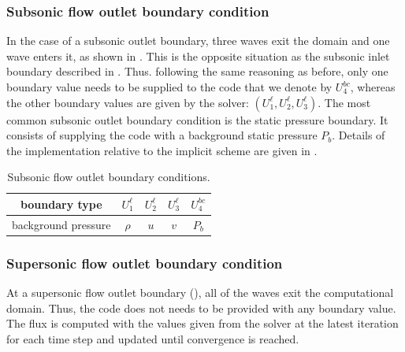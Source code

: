 \subsubsection{Subsonic flow outlet boundary condition} \label{sec:sub-flow-outlet-bc}
In the case of a subsonic outlet boundary, three waves exit the domain and one wave enters it, as shown in . This is the opposite situation as the subsonic inlet boundary described in . Thus. following the same reasoning as before, only one boundary value needs to be supplied to the code that we denote by $U_4^{bc}$, whereas the other boundary values are given by the solver: $\left(U_1^{\ell}, U_2^{\ell}, U_3^{\ell}\right)$. The most common subsonic outlet boundary condition is the static pressure boundary. It consists of supplying the code with a background static pressure $P_b$. Details of the implementation relative to the implicit scheme are given in . 
%
\begin{table}[!htbp]
\begin{center}
\caption{ Subsonic flow outlet boundary conditions.}
\label{tbl:sub-outlet-flow-bc}
\begin{tabular}{|c|c|c|c|c|}
 \hline
boundary type & $U_1^{\ell}$  & $U_2^{\ell}$ & $U_3^{\ell}$ & $U_4^{bc}$ \\  \hline
background pressure & $\rho$     & $u$    & $v$  & $P_b$     \\  \hline
\end{tabular}
\end{center}
\end{table}
\subsubsection{Supersonic flow outlet boundary condition} \label{sec:sup-flow-outlet-bc}
At a supersonic flow outlet boundary (), all of the waves exit the computational domain. Thus, the code does not needs to be provided with any boundary value. The flux is computed with the values given from the solver at the latest iteration for each time step and updated until convergence is reached. 
